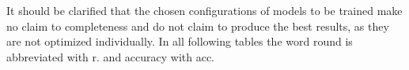 It should be clarified that the chosen configurations of models to be trained make no claim to completeness and do not claim to produce the best results, as they are not optimized individually. In all following tables the word round is abbreviated with r. and accuracy with acc. 


\newpage

